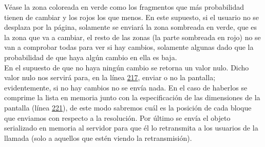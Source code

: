 \documentclass[12pt, a4paper]{book} %
\begin{document}
\begin{itemize}
\begin{center}
					\end{center}
					Véase la zona coloreada en verde como los fragmentos que más probabilidad tienen de cambiar y los rojos los que menos. En este supuesto, si el usuario no se desplaza por la página, solamente se enviará la zona sombreada en verde, que es la zona que va a cambiar, el resto de las zonas (la parte sombreada en rojo) no se van a comprobar todas para ver si hay cambios, solamente algunas dado que la probabilidad de que haya algún cambio en ella es baja.\\
					En el supuesto de que no haya ningún cambio se retorna un valor nulo. Dicho valor nulo nos servirá para, en la línea \hyperlink{../Baco/Recorder/ScreenRecorder.cs217}{217}, enviar o no la pantalla; evidentemente, si no hay cambios no se envía nada. En el caso de haberlos se comprime la lista en memoria junto con la especificación de las dimensiones de la pantalla (línea \hyperlink{../Baco/Recorder/ScreenRecorder.cs221}{221}), de este modo sabremos cuál es la posición de cada bloque que enviamos con respecto a la resolución. Por último se envía el objeto serializado en memoria al servidor para que él lo retransmita a los usuarios de la llamada (solo a aquellos que estén viendo la retransmisión).
				\end{itemize}
\end{document}
